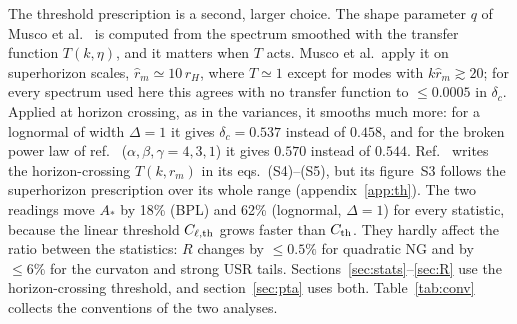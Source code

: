 \documentclass[a4paper,11pt]{article}
\begin{document}
The threshold prescription is a second, larger choice. The shape parameter $q$ of Musco et
al.~\cite{Musco21} is computed from the spectrum smoothed with the transfer function $T(k,\eta)$,
and it matters when $T$ acts. Musco et al.\ apply it on superhorizon scales, $\hat r_m\simeq10\,r_H$,
where $T\simeq1$ except for modes with $k\hat r_m\gtrsim20$; for every spectrum used here this
agrees with no transfer function to $\le0.0005$ in $\delta_c$. Applied at horizon crossing, as in
the variances, it smooths much more: for a lognormal of width $\Delta=1$ it gives $\delta_c=0.537$
instead of $0.458$, and for the broken power law of ref.~\cite{FIVT23} ($\alpha,\beta,\gamma=4,3,1$)
it gives $0.570$ instead of $0.544$. Ref.~\cite{FIVT23} writes the horizon-crossing $T(k,r_m)$ in
its eqs.~(S4)--(S5), but its figure~S3 follows the superhorizon prescription over its whole range
(appendix~\ref{app:th}). The two readings move $A_*$ by 18\% (BPL) and 62\% (lognormal, $\Delta=1$)
for every statistic, because the linear threshold $C_{\ell,\rm th}$ grows faster than $C_{\rm th}$.
They hardly affect the ratio between the statistics: $R$ changes by $\le0.5\%$ for quadratic NG
and by $\le6\%$ for the curvaton and strong USR tails. Sections~\ref{sec:stats}--\ref{sec:R} use
the horizon-crossing threshold, and section~\ref{sec:pta} uses both. Table~\ref{tab:conv} collects
the conventions of the two analyses.
\end{document}
